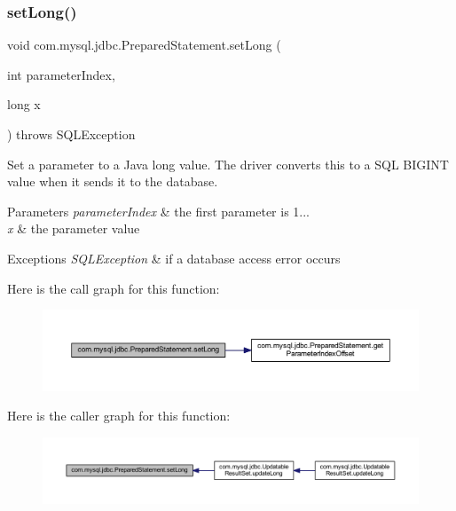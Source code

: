 \subsubsection{\texorpdfstring{set\+Long()}{setLong()}}
{\footnotesize\ttfamily void com.\+mysql.\+jdbc.\+Prepared\+Statement.\+set\+Long (\begin{DoxyParamCaption}\item[{int}]{parameter\+Index,  }\item[{long}]{x }\end{DoxyParamCaption}) throws S\+Q\+L\+Exception}

Set a parameter to a Java long value. The driver converts this to a S\+QL B\+I\+G\+I\+NT value when it sends it to the database.


\begin{DoxyParams}{Parameters}
{\em parameter\+Index} & the first parameter is 1... \\
\hline
{\em x} & the parameter value\\
\hline
\end{DoxyParams}

\begin{DoxyExceptions}{Exceptions}
{\em S\+Q\+L\+Exception} & if a database access error occurs \\
\hline
\end{DoxyExceptions}
Here is the call graph for this function\+:
\nopagebreak
\begin{figure}[H]
\begin{center}
\leavevmode
\includegraphics[width=350pt]{classcom_1_1mysql_1_1jdbc_1_1_prepared_statement_a56039ead85e37c1c6d019cb62f584ef9_cgraph}
\end{center}
\end{figure}
Here is the caller graph for this function\+:
\nopagebreak
\begin{figure}[H]
\begin{center}
\leavevmode
\includegraphics[width=350pt]{classcom_1_1mysql_1_1jdbc_1_1_prepared_statement_a56039ead85e37c1c6d019cb62f584ef9_icgraph}
\end{center}
\end{figure}
\mbox{\label{classcom_1_1mysql_1_1jdbc_1_1_prepared_statement_af1b2dd7f3f872f4ff1400be1d760e200}} 
